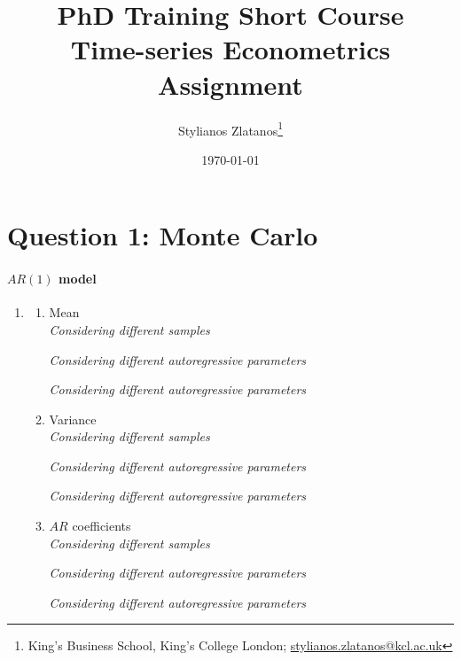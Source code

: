 \documentclass{article}
\title{PhD Training Short Course \\ Time-series Econometrics \\ Assignment}
\author[1]{Stylianos Zlatanos\thanks{King's Business School, King's College London; \href{mailto:stylianos.zlatanos@kcl.ac.uk}{stylianos.zlatanos@kcl.ac.uk}}}
\date{\today}
\begin{document}
\maketitle

\section{Question 1: Monte Carlo}
\paragraph{$AR(1)$ model}
\begin{enumerate}
    \item 
    \begin{enumerate}
        \item Mean \\ \textit{Considering different samples}
        
        \par
        \textit{Considering different autoregressive parameters}
        
         \par
        \textit{Considering different autoregressive parameters}
        
        \item Variance \\ \textit{Considering different samples}
        
        \par
        \textit{Considering different autoregressive parameters}
        
         \par
        \textit{Considering different autoregressive parameters}
        
        \item $AR$ coefficients \\ \textit{Considering different samples}
        
        \par
        \textit{Considering different autoregressive parameters}
        
         \par
        \textit{Considering different autoregressive parameters}
        
    \end{enumerate}
\end{enumerate}
\end{document}

